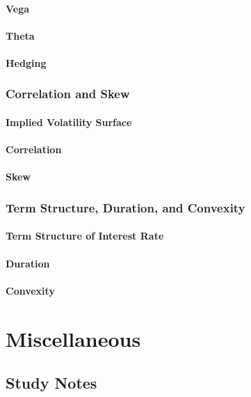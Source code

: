 \documentclass{book}
\begin{document}
\subsection{Vega}
\subsection{Theta}
\subsection{Hedging}

\section{Correlation and Skew}
\subsection{Implied Volatility Surface}
\subsection{Correlation}
\subsection{Skew}

\section{Term Structure, Duration, and Convexity}
\subsection{Term Structure of Interest Rate}
\subsection{Duration}
\subsection{Convexity}

\part{Miscellaneous}
\chapter{Study Notes}
\end{document}

